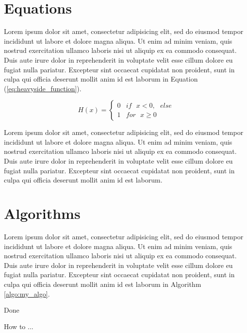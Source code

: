 
\section{Equations}
\label{sec:equations}
Lorem ipsum dolor sit amet, consectetur adipisicing elit, sed do eiusmod
tempor incididunt ut labore et dolore magna aliqua. Ut enim ad minim veniam,
quis nostrud exercitation ullamco laboris nisi ut aliquip ex ea commodo
consequat. Duis aute irure dolor in reprehenderit in voluptate velit esse
cillum dolore eu fugiat nulla pariatur. Excepteur sint occaecat cupidatat non
proident, sunt in culpa qui officia deserunt mollit anim id est laborum in Equation (\ref{eq:heavyside_function}).

\begin{equation}\label{eq:heavyside_function}
H(x) = 
\begin{cases}
0 &\text{$if$ $x < 0,$ $else$}\\
1 &\text{$for$ $x \geq 0$}
\end{cases}
\end{equation}

Lorem ipsum dolor sit amet, consectetur adipisicing elit, sed do eiusmod
tempor incididunt ut labore et dolore magna aliqua. Ut enim ad minim veniam,
quis nostrud exercitation ullamco laboris nisi ut aliquip ex ea commodo
consequat. Duis aute irure dolor in reprehenderit in voluptate velit esse
cillum dolore eu fugiat nulla pariatur. Excepteur sint occaecat cupidatat non
proident, sunt in culpa qui officia deserunt mollit anim id est laborum.



\section{Algorithms}
\label{sec:algorithms}
Lorem ipsum dolor sit amet, consectetur adipisicing elit, sed do eiusmod
tempor incididunt ut labore et dolore magna aliqua. Ut enim ad minim veniam,
quis nostrud exercitation ullamco laboris nisi ut aliquip ex ea commodo
consequat. Duis aute irure dolor in reprehenderit in voluptate velit esse
cillum dolore eu fugiat nulla pariatur. Excepteur sint occaecat cupidatat non
proident, sunt in culpa qui officia deserunt mollit anim id est laborum in Algorithm \ref{algo:my_algo}.

\begin{algorithm}[h!]

\BlankLine
{}
Done

\caption{How to ...}
\label{algo:my_algo}
\end{algorithm}

